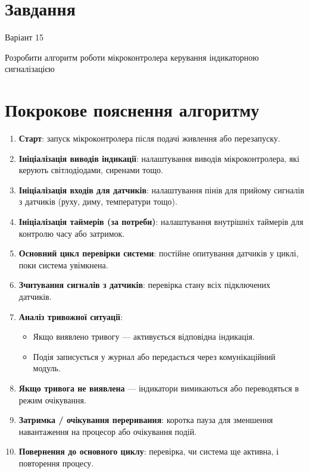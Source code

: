 \documentclass[a4paper]{article}
\begin{document}
\section*{Завдання}
Варіант 15

Розробити алгоритм роботи мікроконтролера керування індикаторною
сигналізацією



\section*{Покрокове пояснення алгоритму}
\begin{enumerate}
    \item \textbf{Старт}: запуск мікроконтролера після подачі живлення або перезапуску.
    \item \textbf{Ініціалізація виводів індикації}: налаштування виводів мікроконтролера, які керують світлодіодами, сиренами тощо.
    \item \textbf{Ініціалізація входів для датчиків}: налаштування пінів для прийому сигналів з датчиків (руху, диму, температури тощо).
    \item \textbf{Ініціалізація таймерів (за потреби)}: налаштування внутрішніх таймерів для контролю часу або затримок.
    \item \textbf{Основний цикл перевірки системи}: постійне опитування датчиків у циклі, поки система увімкнена.
    \item \textbf{Зчитування сигналів з датчиків}: перевірка стану всіх підключених датчиків.
    \item \textbf{Аналіз тривожної ситуації}:
    \begin{itemize}
        \item Якщо виявлено тривогу — активується відповідна індикація.
        \item Подія записується у журнал або передається через комунікаційний модуль.
    \end{itemize}
    \item \textbf{Якщо тривога не виявлена} — індикатори вимикаються або переводяться в режим очікування.
    \item \textbf{Затримка / очікування переривання}: коротка пауза для зменшення навантаження на процесор або очікування подій.
    \item \textbf{Повернення до основного циклу}: перевірка, чи система ще активна, і повторення процесу.
\end{enumerate}
\end{document}

